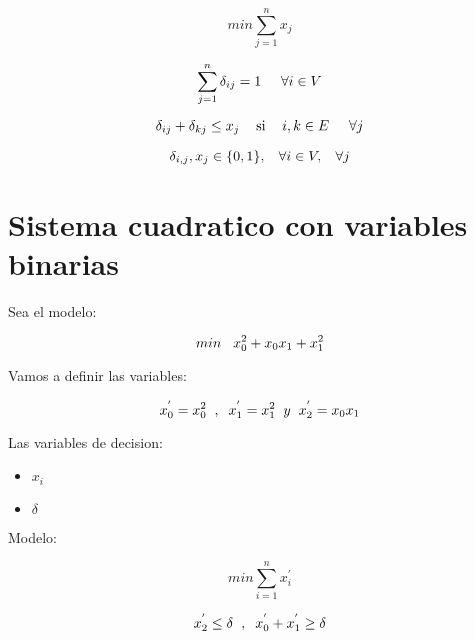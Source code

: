 \documentclass[]{article}
\begin{document}
$$
	min \sum_{j=1}^{n} x_j
$$

$$
\sum_{j=1}^{n} \delta_{ij}  = 1 \hspace{0.5cm} \forall i \in V 
$$

$$
\delta_{ij} + \delta_{kj} \leq x_j  \hspace{0.3cm} \mbox{ si } \hspace{0.3cm} i,k \in E \hspace{0.5cm} \forall j
$$

$$
\delta_{i,j} , x_j \in \{0,1\}, \hspace{0.3cm} \forall i \in V, \hspace{0.3cm} \forall j  
$$


\section{Sistema cuadratico con variables binarias} 

Sea el modelo: 

$$
min \hspace{0.3cm} x_{0}^{2} + x_0x_1 + x_{1}^{2}
$$


Vamos a definir las variables: 

$$
x_{0}^{'} = x_{0}^{2} \hspace{0.2cm} , \hspace{0.2cm} x_{1}^{'} = x_{1}^{2} \hspace{0.2cm} y \hspace{0.2cm} x_{2}^{'} = x_{0} x_{1}
$$

Las variables de decision:

\begin{itemize}
	\item $x_i$ 
	\item $\delta$
\end{itemize}


Modelo:

$$min \sum_{i=1}^{n} x_{i}^{'}$$

$$x_{2}^{'} \leq \delta  \hspace{0.2cm} , \hspace{0.2cm} x_{0}^{'} + x_{1}^{'} \geq \delta$$
\end{document}
